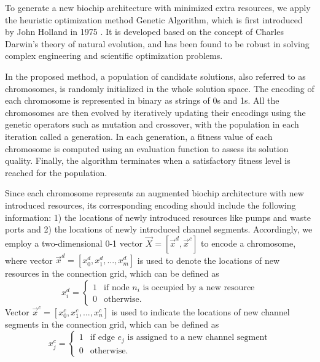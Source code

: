 To generate a new biochip architecture with minimized extra resources, we apply the heuristic optimization method Genetic Algorithm, which is first introduced by John Holland in 1975 \cite{mitchell1998introduction}. It is developed based on the concept of Charles Darwin's theory of natural evolution, and has been found to be robust in solving complex engineering and scientific optimization problems.

In the proposed method, a population of candidate solutions, also referred to as chromosomes, is randomly initialized in the whole solution space. The encoding of each chromosome is represented in binary as strings of 0s and 1s. All the chromosomes are then evolved by iteratively updating their encodings using the genetic operators such as mutation and crossover, with the population in each iteration called a generation. In each generation, a fitness value of each chromosome is computed using an evaluation function to assess its solution quality. Finally, the algorithm terminates when a satisfactory fitness level is reached for the population.

Since each chromosome represents an augmented biochip architecture with new introduced resources, its corresponding encoding should include the following information: 1) the locations of newly introduced resources like pumps and waste ports and 2) the locations of newly introduced channel segments. Accordingly, we employ a two-dimensional 0-1 vector $\vec{X} = [\vec{x}^{d}, \vec{x}^{c}]$ to encode a chromosome, where vector $\vec{x}^{d}= [x^d_0,x^d_1,...,x^d_m]$ is used to denote the locations of new resources in the connection grid, which can be defined as
\begin{equation}
  x^d_i =
  \begin{cases}
    1 & \text{if node $n_i$ is occupied by a new resource}\\
    0 & \text{otherwise.}
  \end{cases}
\end{equation}
Vector $\vec{x}^{c} = [x^c_0,x^c_1,...,x^c_n]$ is used to indicate the locations of new channel segments in the connection grid, which can be defined as
\begin{equation}
  x^c_j =
  \begin{cases}
    1 & \text{if edge $e_j$ is assigned to a new channel segment}\\
    0 & \text{otherwise.}
  \end{cases}
\end{equation}

